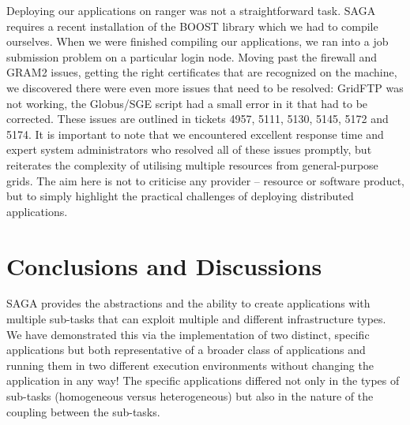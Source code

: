 \documentclass{llncs}
\begin{document}
Deploying our applications on ranger was not a straightforward task.
SAGA requires a recent installation of the BOOST library which we had
to compile ourselves. When we were finished compiling our
applications, we ran into a job submission problem on a particular
login node. %
Moving past the firewall and GRAM2 issues, getting the right
certificates that are recognized on the machine, we discovered there
were even more issues that need to be resolved: GridFTP was not
working, the Globus/SGE script had a small error in it that had to be
corrected.  These issues are outlined in tickets 4957, 5111, 5130,
5145, 5172 and 5174. It is important to note that we encountered
excellent response time and expert system administrators who resolved
all of these issues promptly, but reiterates the complexity of
utilising multiple resources from general-purpose grids.  The aim here
is not to criticise any provider -- resource or software product, but
to simply highlight the practical challenges of deploying distributed
applications.




\up\upp

\section{Conclusions and Discussions}

\upp

SAGA provides the abstractions and the ability to create applications
with multiple sub-tasks that can exploit multiple and different
infrastructure types.  We have demonstrated this via the
implementation of two distinct, specific applications but both
representative of a broader class of applications and running them in
two different execution environments without changing the application
in any way! The specific applications differed not only in the types
of sub-tasks (homogeneous versus heterogeneous) but also in the nature
of the coupling between the sub-tasks.
  
\end{document}
